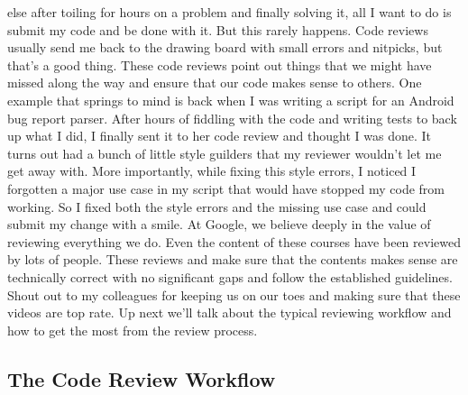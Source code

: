 else after toiling for hours on a problem and finally solving it, all I want to do is submit my code and be done with it. But this rarely happens. Code reviews usually send me back to the drawing board with small errors and nitpicks, but that's a good thing. These code reviews point out things that we might have missed along the way and ensure that our code makes sense to others. One example that springs to mind is back when I was writing a script for an Android bug report parser. After hours of fiddling with the code and writing tests to back up what I did, I finally sent it to her code review and thought I was done. It turns out had a bunch of little style guilders that my reviewer wouldn't let me get away with. More importantly, while fixing this style errors, I noticed I forgotten a major use case in my script that would have stopped my code from working. So I fixed both the style errors and the missing use case and could submit my change with a smile. At Google, we believe deeply in the value of reviewing everything we do. Even the content of these courses have been reviewed by lots of people. These reviews and make sure that the contents makes sense are technically correct with no significant gaps and follow the established guidelines. Shout out to my colleagues for keeping us on our toes and making sure that these videos are top rate. Up next we'll talk about the typical reviewing workflow and how to get the most from the review process.
	
	\subsection{The Code Review Workflow}
	
